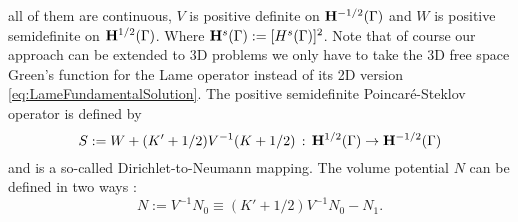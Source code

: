 \documentclass[12pt,a4paper]{scrbook}
\begin{document}
all of them  are continuous, $V$ is positive definite on $\mathbf{H}^{-1/2}(\Gamma)$ and $W$ is positive semidefinite on $\mathbf{H}^{1/2}(\Gamma)$. Where $\mathbf{H}^{s}(\Gamma):=[H^{s}(\Gamma)]^2$. Note that of course our approach can be extended to 3D problems we only have to take the 3D free space Green's function for the Lame operator instead of its 2D version \ref{eq:LameFundamentalSolution}. The positive semidefinite Poincar\'e-Steklov \cite{CarSt95} operator is defined by
\begin{equation}\label{eq:PoincareSteklovDef}
  S:=W+(K'+1/2)V^{-1}(K+1/2)\,:\,
  \mathbf{H}^{1/2}(\Gamma) \rightarrow \mathbf{H}^{-1/2}(\Gamma)
\end{equation}
and is a so-called Dirichlet-to-Neumann mapping. The volume potential $N$ can be defined in two ways \cite{EcStbWn99}:
\begin{equation}\label{eq:NewtonPotentialDef}
N := V^{-1} N_0 \equiv (K'+1/2) V^{-1} N_0 - N_1.
\end{equation}
\newpage
{}

\end{document}
